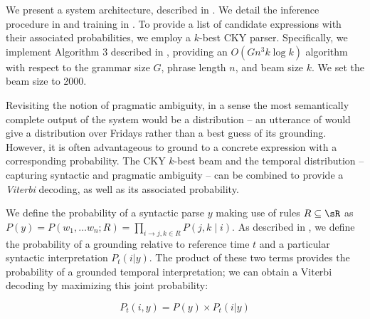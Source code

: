 We present a system architecture, described in .
We detail the inference procedure in 
	and training in .
To provide a list of
	candidate expressions with their associated probabilities, we
	employ a $k$-best CKY parser.
Specifically, we implement Algorithm 3 described in 
	, providing an $O(Gn^3k\log k)$ algorithm
	with respect to the grammar size $G$, phrase length $n$, and beam size $k$.
We set the beam size to 2000.

Revisiting the notion of pragmatic ambiguity,
	in a sense the most semantically complete output of the system would be
	a distribution -- 
	an utterance of  would give a distribution over Fridays
	rather than a best guess of its grounding.
However, it is often advantageous to ground to a concrete expression with a
	corresponding probability.
The CKY $k$-best beam and the temporal distribution 
	-- capturing syntactic and pragmatic ambiguity --
	can be combined to provide a \textit{Viterbi} decoding, as well as
	its associated probability.

We define the probability of a syntactic parse $y$ making use of rules 
	$R \subseteq \sR$ as
	$P(y) = P(w_1,\dots w_n; R) = \prod_{i \rightarrow j,k \in R}P(j,k \mid i)$.
	As described in , we define the probability of a 
	grounding relative to reference time $t$ and a particular
	syntactic interpretation $P_t(i | y)$.
The product of these two terms provides the probability of a grounded temporal
	interpretation; we can obtain a Viterbi decoding by maximizing this
	joint probability:

\begin{equation}
	P_t(i, y) = 
		P( y ) \times P_t(i | y)
\label{eqn:prob}
\end{equation}


